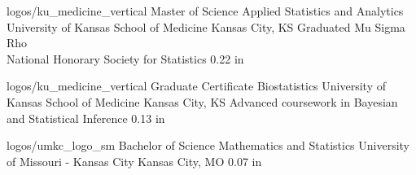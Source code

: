 
\EducationExtraNoDate
{logos/ku_medicine_vertical}
{Master of Science}
{Applied Statistics and Analytics}
{University of Kansas School of Medicine}
{Kansas City, KS}
{Graduated Mu Sigma Rho\\ National Honorary Society for
Statistics}
{0.22 in}

\vspace*{0.01 in}

\EducationExtraNoDate
{logos/ku_medicine_vertical}
{Graduate Certificate}
{Biostatistics}
{University of Kansas School of Medicine}
{Kansas City, KS}
{Advanced coursework in Bayesian and Statistical Inference}
{0.13 in}

\vspace*{0.01 in}

\EducationNoDate
{logos/umkc_logo_sm}
{Bachelor of Science}
{Mathematics and Statistics}
{University of Missouri - Kansas City}
{Kansas City, MO}
{0.07 in}
